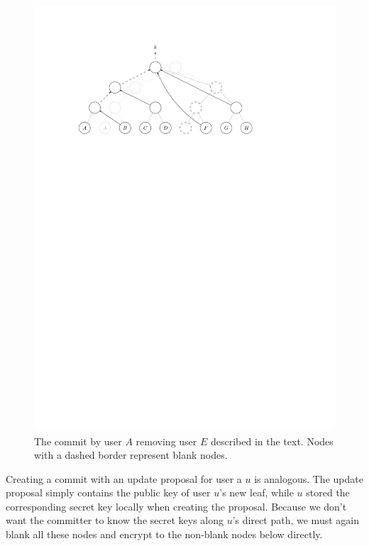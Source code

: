 \begin{figure}
	\begin{center}
		\includegraphics{figures/treekem-remove}
	\end{center}
	\caption{The commit by user $A$ removing user $E$ described in the text. Nodes with a dashed border represent blank nodes.}\label{fig:treekem-remove}
\end{figure}

Creating a commit with an update proposal for user a $u$ is analogous. The update proposal simply contains the public key of user $u$'s new leaf, while $u$ stored the corresponding secret key locally when creating the proposal. Because we don't want the committer to know the secret keys along $u$'s direct path, we must again blank all these nodes and encrypt to the non-blank nodes below directly.

